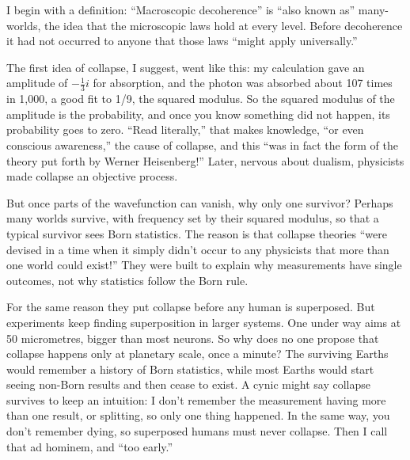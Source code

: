 
I begin with a definition: ``Macroscopic decoherence'' is ``also known as'' many-worlds, the idea that the microscopic laws hold at every level.  Before decoherence it had not occurred to anyone that those laws ``might apply universally.'' 

The first idea of collapse, I suggest, went like this: my calculation gave an amplitude of $-\frac{1}{3}i$ for absorption, and the photon was absorbed about 107 times in 1,000, a good fit to 1/9, the squared modulus. So the squared modulus of the amplitude is the probability, and once you know something did not happen, its probability goes to zero. ``Read literally,'' that makes knowledge, ``or even conscious awareness,'' the cause of collapse, and this ``was in fact the form of the theory put forth by Werner Heisenberg!''  Later, nervous about dualism, physicists made collapse an objective process.

But once parts of the wavefunction can vanish, why only one survivor? Perhaps many worlds survive, with frequency set by their squared modulus, so that a typical survivor sees Born statistics. The reason is that collapse theories ``were devised in a time when it simply didn't occur to any physicists that more than one world could exist!'' They were built to explain why measurements have single outcomes, not why statistics follow the Born rule. 

For the same reason they put collapse before any human is superposed. But experiments keep finding superposition in larger systems. One under way aims at 50 micrometres, bigger than most neurons. So why does no one propose that collapse happens only at planetary scale, once a minute? The surviving Earths would remember a history of Born statistics, while most Earths would start seeing non-Born results and then cease to exist.  A cynic might say collapse survives to keep an intuition: I don't remember the measurement having more than one result, or splitting, so only one thing happened. In the same way, you don't remember dying, so superposed humans must never collapse. Then I call that ad hominem, and ``too early.''


